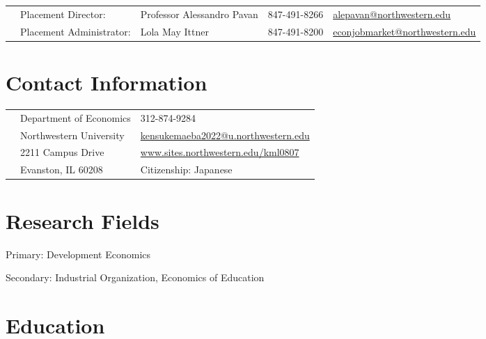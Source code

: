 \documentclass[margin,line]{res}
\newenvironment{list1}{
  \begin{list}{\ding{113}}{%
      \setlength{\itemsep}{.025in}
      \setlength{\parsep}{0in} \setlength{\parskip}{0in}
      \setlength{\topsep}{0in} \setlength{\partopsep}{0in}
      \setlength{\leftmargin}{0.17in}}}{\end{list}}
\begin{document}

~\\
~\\

\begin{resume}
\thispagestyle{plain} %

\begin{table}[h]
\footnotesize
\begin{tabular}{@{}p{0.20in}p{1.5in}p{1.4in}p{.7in}p{1.5in}}
& Placement Director:	& Professor Alessandro Pavan & 847-491-8266  & \href{mailto: alepavan@northwestern.edu}{alepavan@northwestern.edu}\\
& Placement Administrator:	& Lola May Ittner & 847-491-8200  & \href{mailto: econjobmarket@northwestern.edu}{econjobmarket@northwestern.edu}\\
 \end{tabular}
\end{table}

\section{Contact Information}
\vspace{.05in}
\begin{tabular}{@{}p{0.20in}p{2.75in}p{2.75in}}
 & Department of Economics           & 312-874-9284 \\
 & Northwestern University   &  \href{mailto: kensukemaeba2022@u.northwestern.edu}{kensukemaeba2022@u.northwestern.edu} \\
 & 2211 Campus Drive &  \href{http://sites.northwestern.edu/kml0807}{www.sites.northwestern.edu/kml0807}\\
 & Evanston, IL 60208  & Citizenship: Japanese
\end{tabular}

\section{Research Fields}
\begin{list1}
\item[] Primary: Development Economics
\item[] Secondary: Industrial Organization, Economics of Education
\vspace*{.05in}
\end{list1}

\section{ Education}\begin{tiny}


\end{tiny}
\end{resume}
\end{document}
